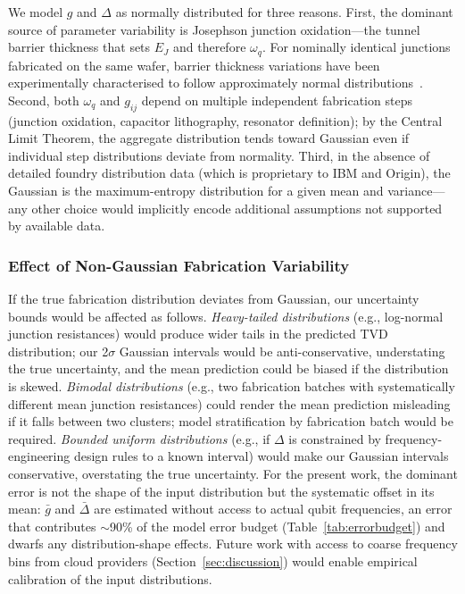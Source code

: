 \documentclass[ASNA,twocolumn]{USG}
\begin{document}
We model $g$ and $\Delta$ as normally distributed for three reasons. First, the dominant source of parameter variability is Josephson junction oxidation---the tunnel barrier thickness that sets $E_J$ and therefore $\omega_q$. For nominally identical junctions fabricated on the same wafer, barrier thickness variations have been experimentally characterised to follow approximately normal distributions~\cite{osman2023mitigation,alghadeer2025crosstalk}. Second, both $\omega_q$ and $g_{ij}$ depend on multiple independent fabrication steps (junction oxidation, capacitor lithography, resonator definition); by the Central Limit Theorem, the aggregate distribution tends toward Gaussian even if individual step distributions deviate from normality. Third, in the absence of detailed foundry distribution data (which is proprietary to IBM and Origin), the Gaussian is the maximum-entropy distribution for a given mean and variance---any other choice would implicitly encode additional assumptions not supported by available data.

\subsubsection*{Effect of Non-Gaussian Fabrication Variability}

If the true fabrication distribution deviates from Gaussian, our uncertainty bounds would be affected as follows. \textit{Heavy-tailed distributions} (e.g., log-normal junction resistances) would produce wider tails in the predicted TVD distribution; our 2$\sigma$ Gaussian intervals would be anti-conservative, understating the true uncertainty, and the mean prediction could be biased if the distribution is skewed. \textit{Bimodal distributions} (e.g., two fabrication batches with systematically different mean junction resistances) could render the mean prediction misleading if it falls between two clusters; model stratification by fabrication batch would be required. \textit{Bounded uniform distributions} (e.g., if $\Delta$ is constrained by frequency-engineering design rules to a known interval) would make our Gaussian intervals conservative, overstating the true uncertainty. For the present work, the dominant error is not the shape of the input distribution but the systematic offset in its mean: $\bar{g}$ and $\bar{\Delta}$ are estimated without access to actual qubit frequencies, an error that contributes $\sim$90\% of the model error budget (Table~\ref{tab:errorbudget}) and dwarfs any distribution-shape effects. Future work with access to coarse frequency bins from cloud providers (Section~\ref{sec:discussion}) would enable empirical calibration of the input distributions.
\end{document}
